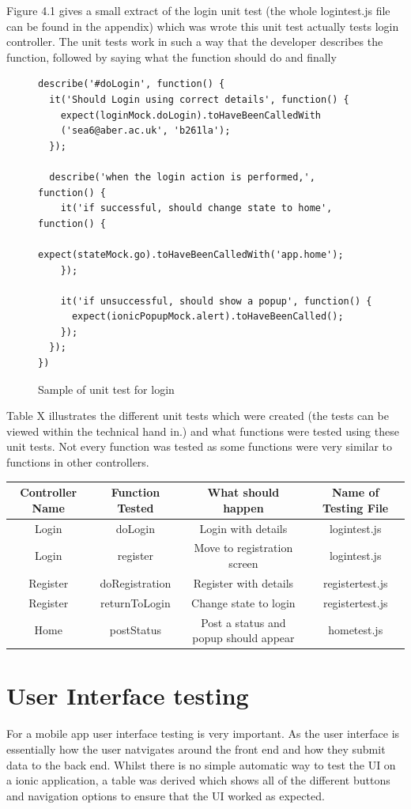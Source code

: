 Figure 4.1 gives a small extract of the login unit test (the whole logintest.js file can be found in the appendix) which was wrote this unit test actually tests login controller. The unit tests work in such a way that the developer describes the function, followed by saying what the function should do and finally 

\begin{figure}[H]

\begin{verbatim}
describe('#doLogin', function() {
  it('Should Login using correct details', function() {
    expect(loginMock.doLogin).toHaveBeenCalledWith
    ('sea6@aber.ac.uk', 'b261la'); 
  });

  describe('when the login action is performed,', function() {
    it('if successful, should change state to home', function() {
      expect(stateMock.go).toHaveBeenCalledWith('app.home');
    });

    it('if unsuccessful, should show a popup', function() {
      expect(ionicPopupMock.alert).toHaveBeenCalled();
    });
  });
})
\end{verbatim}
\caption{Sample of unit test for login}
\end{figure}

Table X illustrates the different unit tests which were created (the tests can be viewed within the technical hand in.) and what functions were tested using these unit tests. Not every function was tested as some functions were very similar to functions in other controllers.

\begin{tabular} {||c c c c||}  
\hline
 Controller Name & Function Tested & What should happen & Name of Testing File\\
 \hline
 \hline 
 Login & doLogin & Login with details & logintest.js \\
 \hline
 Login & register &Move to registration screen & logintest.js \\
 \hline
 Register & doRegistration & Register with details & registertest.js \\
 \hline
 Register & returnToLogin & Change state to login & registertest.js \\
 \hline
 Home & postStatus & Post a status and popup should appear & hometest.js \\
 \hline
 \end{tabular}


\section{User Interface testing}
For a mobile app user interface testing is very important. As the user interface is essentially how the user natvigates around the front end and how they submit data to the back end. Whilst there is no simple automatic way to test the UI on a ionic application, a table was derived which shows all of the different buttons and navigation options to ensure that the UI worked as expected.

